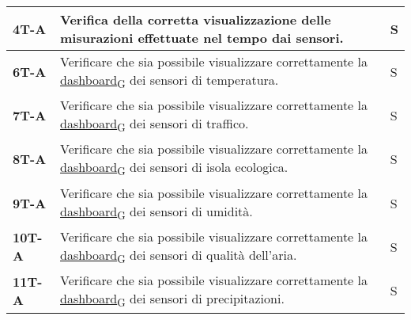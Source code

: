 \begin{longtable}{|>{\raggedright\arraybackslash}m{}|>{\raggedright\arraybackslash}m{}|>{\raggedright\arraybackslash}m{}|}
	\hline
	\textbf{4T-A}   & Verifica della corretta visualizzazione delle misurazioni effettuate nel tempo dai sensori.                                                                                                                                                                                                                     & S              \\
	\hline
	\textbf{6T-A}   & Verificare che sia possibile visualizzare correttamente la \href{https://7last.github.io/docs/pb/documentazione-interna/glossario\#dashboard}{dashboard\textsubscript{G}} dei sensori di temperatura.                                                                                                           & S              \\
	\hline
	\textbf{7T-A}   & Verificare che sia possibile visualizzare correttamente la \href{https://7last.github.io/docs/pb/documentazione-interna/glossario\#dashboard}{dashboard\textsubscript{G}} dei sensori di traffico.                                                                                                              & S              \\
	\hline
	\textbf{8T-A}   & Verificare che sia possibile visualizzare correttamente la \href{https://7last.github.io/docs/pb/documentazione-interna/glossario\#dashboard}{dashboard\textsubscript{G}} dei sensori di isola ecologica.                                                                                                       & S              \\
	\hline
	\textbf{9T-A}   & Verificare che sia possibile visualizzare correttamente la \href{https://7last.github.io/docs/pb/documentazione-interna/glossario\#dashboard}{dashboard\textsubscript{G}} dei sensori di umidità.                                                                                                               & S              \\
	\hline
	\textbf{10T-A}  & Verificare che sia possibile visualizzare correttamente la \href{https://7last.github.io/docs/pb/documentazione-interna/glossario\#dashboard}{dashboard\textsubscript{G}} dei sensori di qualità dell'aria.                                                                                                     & S              \\
	\hline
	\textbf{11T-A}  & Verificare che sia possibile visualizzare correttamente la \href{https://7last.github.io/docs/pb/documentazione-interna/glossario\#dashboard}{dashboard\textsubscript{G}} dei sensori di precipitazioni.                                                                                                        & S              \\

\end{longtable}
